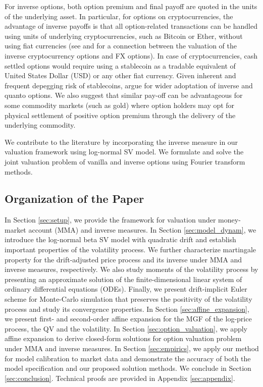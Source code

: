 \documentclass[pdftex,11pt,a4paper] {article}
\begin{document}
For inverse options, both option premium and final payoff are quoted in the units of the underlying asset. In particular, for options on cryptocurrencies, the advantage of inverse payoffs is that all option-related transactions can be handled using units of underlying cryptocurrencies, such as Bitcoin or Ether, without using fiat currencies (see \cite{Lucic2022} and \cite{LucicSepp2023} for a connection between the valuation of the inverse cryptocurrency options and FX options). In case of cryptocurrencies, cash settled options would require using a stablecoin as a tradable equivalent of United States Dollar (USD) or any other fiat currency. Given inherent and frequent depegging risk of stablecoins, \cite{Alexander2022} argue for wider adoptation of inverse and quanto options. We also suggest that similar pay-off can be advantageous for some commodity markets (such as gold) where option holders may opt for physical settlement of positive option premium through the delivery of the underlying commodity. 


We contribute to the literature by incorporating the inverse measure in our valuation framework using log-normal SV model. We formulate and solve the joint valuation problem of vanilla and inverse options using Fourier transform methods.


\subsection{Organization of the Paper}

In Section \ref{sec:setup}, we provide the framework for valuation under money-market account (MMA) and inverse measures. 
In Section \ref{sec:model_dynam}, we introduce the log-normal beta SV model with quadratic drift and  establish important properties of the volatility process. We further characterize martingale property for the drift-adjusted price process and its inverse under MMA and inverse measures, respectively. We also study moments of the volatility process by presenting an approximate solution of the finite-dimensional linear system of ordinary differential equations (ODEs). Finally, we present drift-implicit Euler scheme for Monte-Carlo simulation that preserves the positivity of the volatility process and study its convergence properties. In Section \ref{sec:affine_expansion}, we present first- and second-order affine expansion for the MGF of the log-price process, the QV and the volatility. 
In Section \ref{sec:option_valuation}, we apply affine expansion to derive closed-form solutions for option valuation problem under MMA and inverse measures.
In Section \ref{sec:empirics}, we apply our method for model calibration to market data and demonstrate the accuracy of both the model specification and our proposed solution methods. We conclude in Section \ref{sec:conclusion}. Technical proofs are provided in Appendix \ref{sec:appendix}. 
\end{document}
